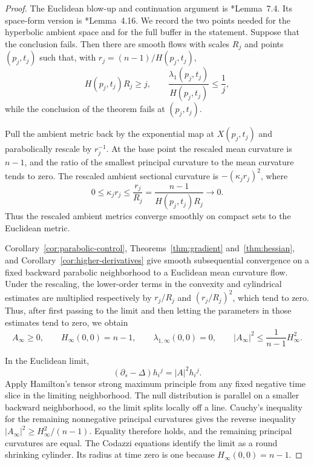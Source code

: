 \documentclass[11pt,reqno]{amsart}
\theoremstyle{definition}
\theoremstyle{remark}
\numberwithin{equation}{section}
\begin{document}
\begin{proof}
The Euclidean blow-up and continuation argument is
  \cite{HS09}*{Lemma~7.4}.  Its space-form version is
  \cite{LN21}*{Lemma~4.16}.  We record the two points needed for the
  hyperbolic ambient space and for the full buffer in the statement.  Suppose
  that the conclusion fails.  Then there are smooth
  flows with scales $R_j$ and points $(p_j,t_j)$ such that, with
  $r_j=(n-1)/H(p_j,t_j)$,
  \begin{equation*}
  H(p_j,t_j)R_j\geq j,
  \qquad
  \frac{\lambda_1(p_j,t_j)}{H(p_j,t_j)}\leq\frac1j,
  \end{equation*}
  while the conclusion of the theorem fails at $(p_j,t_j)$.

  Pull the ambient metric back by the exponential map at $X(p_j,t_j)$ and
  parabolically rescale by $r_j^{-1}$.  At the base point the rescaled mean
  curvature is $n-1$, and the ratio of the smallest principal curvature to
  the mean curvature tends to zero.  The rescaled ambient sectional curvature
  is $-(\kappa_jr_j)^2$, where
  \begin{equation*}
    0\leq\kappa_jr_j
    \leq\frac{r_j}{R_j}
    =\frac{n-1}{H(p_j,t_j)R_j}
    \longrightarrow0.
  \end{equation*}
  Thus the rescaled ambient metrics converge smoothly on compact sets to the
  Euclidean metric.

  Corollary~\ref{cor:parabolic-control}, Theorems~\ref{thm:gradient}
  and~\ref{thm:hessian}, and Corollary~\ref{cor:higher-derivatives} give
  smooth subsequential convergence on a fixed backward parabolic neighborhood
  to a Euclidean mean curvature flow. Under the rescaling, the lower-order terms in the convexity and cylindrical estimates are multiplied respectively
by $r_j/R_j$ and $(r_j/R_j)^2$, which tend to zero.  Thus, after first
passing to the limit and then letting the parameters in those
estimates tend to zero, we obtain
  \begin{equation*}
    A_\infty\geq0,
    \qquad H_\infty(0,0)=n-1,
    \qquad \lambda_{1,\infty}(0,0)=0,
    \qquad |A_\infty|^2\leq\frac1{n-1}H_\infty^2.
  \end{equation*}

  In the Euclidean limit,
  \begin{equation*}
  (\partial_s-\Delta)h_i{}^j=|A|^2h_i{}^j.
  \end{equation*}
  Apply Hamilton's tensor strong maximum principle \cite{Ham86} from any
  fixed negative time slice in the limiting neighborhood.  The null
  distribution is parallel on a smaller backward neighborhood, so the limit
  splits locally off a line.  Cauchy's inequality for the remaining
  nonnegative principal curvatures gives the reverse inequality
  $|A_\infty|^2\geq H_\infty^2/(n-1)$.  Equality therefore holds, and the
  remaining principal curvatures are equal.  The Codazzi equations identify
  the limit as a round shrinking cylinder.  Its radius at time zero is one
  because $H_\infty(0,0)=n-1$.


\end{proof}
\end{document}
